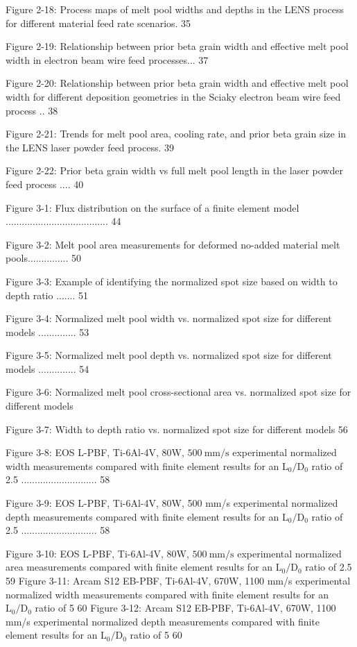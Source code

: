 \documentclass[10pt]{article}
\begin{document}
Figure 2-18: Process maps of melt pool widths and depths in the LENS process for different material feed rate scenarios. 35

Figure 2-19: Relationship between prior beta grain width and effective melt pool width in electron beam wire feed processes... 37

Figure 2-20: Relationship between prior beta grain width and effective melt pool width for different deposition geometries in the Sciaky electron beam wire feed process .. 38

Figure 2-21: Trends for melt pool area, cooling rate, and prior beta grain size in the LENS laser powder feed process. 39

Figure 2-22: Prior beta grain width vs full melt pool length in the laser powder feed process .... 40

Figure 3-1: Flux distribution on the surface of a finite element model ...................................... 44

Figure 3-2: Melt pool area measurements for deformed no-added material melt pools............... 50

Figure 3-3: Example of identifying the normalized spot size based on width to depth ratio ....... 51

Figure 3-4: Normalized melt pool width vs. normalized spot size for different models .............. 53

Figure 3-5: Normalized melt pool depth vs. normalized spot size for different models .............. 54

Figure 3-6: Normalized melt pool cross-sectional area vs. normalized spot size for different models

Figure 3-7: Width to depth ratio vs. normalized spot size for different models 56

Figure 3-8: EOS L-PBF, Ti-6Al-4V, 80W, $500 \mathrm{~mm} / \mathrm{s}$ experimental normalized width measurements compared with finite element results for an $\mathrm{L}_{0} / \mathrm{D}_{0}$ ratio of 2.5 ............................ 58

Figure 3-9: EOS L-PBF, Ti-6Al-4V, 80W, 500 mm/s experimental normalized depth measurements compared with finite element results for an $\mathrm{L}_{0} / \mathrm{D}_{0}$ ratio of 2.5 ............................ 58

Figure 3-10: EOS L-PBF, Ti-6Al-4V, 80W, $500 \mathrm{~mm} / \mathrm{s}$ experimental normalized area measurements compared with finite element results for an $\mathrm{L}_{0} / \mathrm{D}_{0}$ ratio of 2.5 59 Figure 3-11: Arcam S12 EB-PBF, Ti-6Al-4V, 670W, 1100 mm/s experimental normalized width measurements compared with finite element results for an $\mathrm{L}_{0} / \mathrm{D}_{0}$ ratio of 5 60 Figure 3-12: Arcam S12 EB-PBF, Ti-6Al-4V, 670W, 1100 mm/s experimental normalized depth measurements compared with finite element results for an $\mathrm{L}_{0} / \mathrm{D}_{0}$ ratio of 5 60
\end{document}
